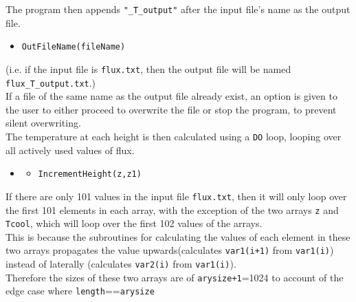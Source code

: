 \documentclass[a4paper, 12pt]{article}
\begin{document}
The program then appends \texttt{"\_T\_output"} after the input file's name as the output file.
\begin{itemize}
	\item \texttt{\textcolor{func}{OutFileName}(fileName)} 
\end{itemize}
(i.e. if the input file is \texttt{flux.txt}, then the output file will be named \texttt{flux\_T\_output.txt}.) \\
If a file of the same name as the output file already exist, an option is given to the user to either proceed to overwrite the file or stop the program, to prevent silent overwriting.\\

The temperature at each height is then calculated using a \texttt{DO} loop, looping over all actively used values of flux.
\begin{itemize}
	\item[]
	\begin{itemize}
	\item \texttt{\textcolor{subr}{IncrementHeight}(z,z1)}
	\end  {itemize}
\end  {itemize}

If there are only 101 values in the input file \texttt{flux.txt}, then it will only loop over the first 101 elements in each array, with the exception of the two arrays \texttt{z} and \texttt{Tcool}, which will loop over the first 102 values of the arrays. \\
This is because the subroutines for calculating the values of each element in these two arrays propagates the value upwards(calculates \texttt{var1(i+1)} from \texttt{var1(i)}) instead of laterally (calculates \texttt{var2(i)} from \texttt{var1(i)}).\\
Therefore the sizes of these two arrays are of \texttt{arysize+1}=1024 to account of the edge case where \texttt{length}==\texttt{arysize}\\
\end{document}

